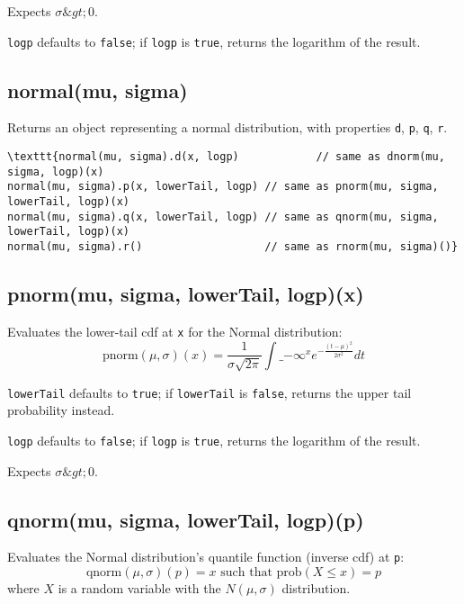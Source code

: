 \documentclass{article}
\begin{document}
Expects $\sigma \&gt; 0$.


\texttt{logp} defaults to \texttt{false}; if \texttt{logp} is \texttt{true}, returns the
logarithm of the result.


    \subsection*{normal(mu, sigma)}
    Returns an object representing a normal distribution, with properties \texttt{d}, \texttt{p}, \texttt{q}, \texttt{r}.


\begin{lstlisting}
\texttt{normal(mu, sigma).d(x, logp)            // same as dnorm(mu, sigma, logp)(x)
normal(mu, sigma).p(x, lowerTail, logp) // same as pnorm(mu, sigma, lowerTail, logp)(x)
normal(mu, sigma).q(x, lowerTail, logp) // same as qnorm(mu, sigma, lowerTail, logp)(x)
normal(mu, sigma).r()                   // same as rnorm(mu, sigma)()}\end{lstlisting}

    \subsection*{pnorm(mu, sigma, lowerTail, logp)(x)}
    Evaluates the lower-tail cdf at \texttt{x} for the Normal distribution:
$$\textrm{pnorm}(\mu, \sigma)(x) = \frac{1}{\sigma \sqrt{2\pi}}\int\_{-\infty}^x e^{\displaystyle -\frac{(t-\mu)^2}{2\sigma^2}}dt$$


\texttt{lowerTail} defaults to \texttt{true}; if \texttt{lowerTail} is \texttt{false}, returns
the upper tail probability instead.


\texttt{logp} defaults to \texttt{false}; if \texttt{logp} is \texttt{true}, returns the logarithm
of the result.


Expects $\sigma \&gt; 0$.


    \subsection*{qnorm(mu, sigma, lowerTail, logp)(p)}
    Evaluates the Normal distribution's quantile function (inverse cdf) at \texttt{p}:
$$\textrm{qnorm}(\mu, \sigma)(p) = x \textrm{ such that } \textrm{prob}(X \leq x) = p$$
where $X$ is a random variable with the $N(\mu,\sigma)$ distribution.
\end{document}
